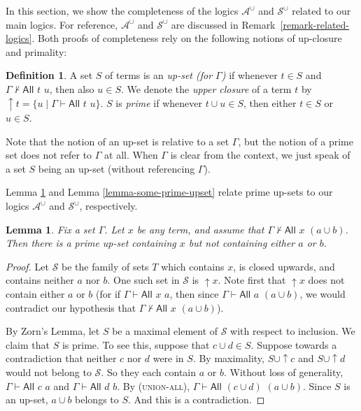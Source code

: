 \documentclass[letterpaper]{article}
\newtheorem{lemma}[theorem]{Lemma}
\theoremstyle{definition}
\newtheorem{definition}[theorem]{Definition}
\renewcommand{\SS}{\mathcal{S}}
\newcommand{\set}[1]{\{ #1 \}}
\newcommand{\proves}{\vdash}
\newcommand{\Aunion}{\mathscr{A}^{\cup}}
\newcommand{\Sunion}{\mathscr{S}^{\cup}}
\newcommand{\proverule}{\textsc}
\newcommand{\unionall}{\proverule{union-all}}
\newcommand{\All}[2]{\mathsf{All}\,\,#1\,\,#2}
\begin{document}
In this section, we show the completeness of the logics $\Aunion$ and $\Sunion$ related to our main logics.  For reference, $\Aunion$ and $\Sunion$ are discussed in Remark~\ref{remark-related-logics}.  Both proofs of completeness rely on the following notions of up-closure and primality:

\begin{definition} 
A set $S$ of terms is an \emph{up-set (for $\Gamma$)} if whenever $t\in S$ and $\Gamma \nvdash \All{t}{u}$, then also $u\in S$.  We denote the \emph{upper closure} of a term $t$ by $\uparrow t = \set{u \mid \Gamma \proves \All{t}{u}}$.
$S$ is \emph{prime} if whenever $t\cup u \in S$, then either $t\in S$ or $u\in S$.
\end{definition}

Note that the notion of an up-set is relative to a set $\Gamma$, but the notion of a prime set does not refer to $\Gamma$ at all.
When $\Gamma$ is clear from the context, we just speak of a set $S$ being an up-set (without referencing $\Gamma$).

Lemma \ref{lemma-zorn} and Lemma \ref{lemma-some-prime-upset} relate prime up-sets to our logics $\Aunion$ and $\Sunion$, respectively.

\begin{lemma}  Fix a set $\Gamma$.
Let $x$ be any term, and assume that $\Gamma \not\proves \All{x}{(a \cup b)}$.
Then there is a prime up-set containing $x$ but not containing either $a$ or $b$.
\label{lemma-zorn}
\end{lemma}

\begin{proof}
Let $\SS$ be the family of sets $T$ which contains $x$, is closed upwards, and contains neither  $a$ nor $b$.
One such set in $\SS$ is $\uparrow x$.  Note first that $\uparrow x$ does not contain either $a$ or $b$ (for if $\Gamma \proves \All{x}{a}$, then since $\Gamma \proves \All{a}{(a \cup b)}$, we would contradict our hypothesis that $\Gamma \not \proves \All{x}{(a \cup b)}$).

By Zorn's Lemma, let $S$ be a maximal element of $\SS$ with respect to inclusion.
We claim that 
$S$ is  prime.   To see this, suppose that $c \cup d\in S$.  Suppose towards a contradiction that neither $c$ nor $d$ were in $S$.
By maximality, $S\cup\uparrow c$ and $S\cup\uparrow d$  would not belong to $\SS$. 
So they each contain $a$ or $b$.   Without loss of generality, $\Gamma \proves \All{c}{a}$ and $\Gamma \proves \All{d}{b}$.  
By (\unionall), $\Gamma \proves \All{(c \cup d)}{(a \cup b)}$.  Since $S$ is an up-set, $a \cup b$ belongs to $S$.  And this is a contradiction.
\end{proof}
\end{document}
